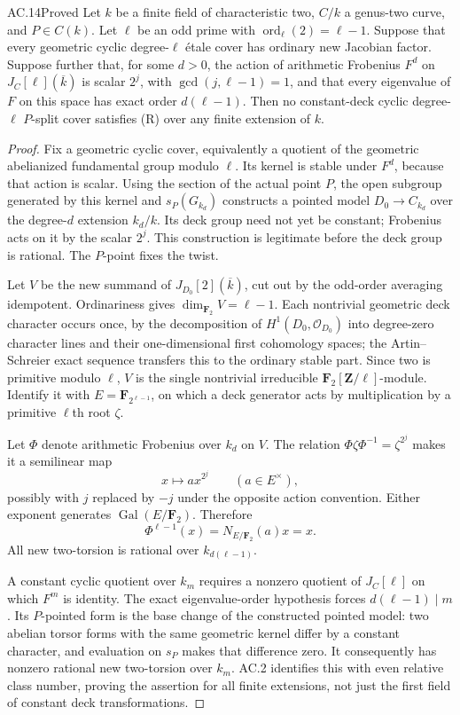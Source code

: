 \begin{claim}{AC.14}{Proved}
Let $k$ be a finite field of characteristic two, $C/k$ a genus-two curve,
and $P\in C(k)$.  Let $\ell$ be an odd prime with
$\operatorname{ord}_{\ell}(2)=\ell-1$.  Suppose that every geometric
cyclic degree-$\ell$ \'etale cover has ordinary new Jacobian factor.
Suppose further that, for some $d>0$, the action of arithmetic Frobenius
$F^d$ on $J_C[\ell](\overline k)$ is scalar $2^j$, with
$\gcd(j,\ell-1)=1$, and that every eigenvalue of $F$ on this space has
exact order $d(\ell-1)$.  Then no constant-deck cyclic degree-$\ell$
$P$-split cover satisfies (R) over any finite extension of $k$.
\end{claim}
\begin{proof}
Fix a geometric cyclic cover, equivalently a quotient of the geometric
abelianized fundamental group modulo $\ell$.  Its kernel is stable under
$F^d$, because that action is scalar.  Using the section of the actual
point $P$, the open subgroup generated by this kernel and $s_P(G_{k_d})$
constructs a pointed model $D_0\to C_{k_d}$ over the degree-$d$ extension
$k_d/k$.  Its deck group need not yet be constant; Frobenius acts on it
by the scalar $2^j$.  This construction is legitimate before the deck
group is rational.  The $P$-point fixes the twist.

Let $V$ be the new summand of $J_{D_0}[2](\overline k)$, cut out by the
odd-order averaging idempotent.  Ordinariness gives
$\dim_{\mathbf F_2}V=\ell-1$.  Each nontrivial geometric deck character
occurs once, by the decomposition of
$H^1(D_0,\mathcal O_{D_0})$ into degree-zero character lines and their
one-dimensional first cohomology spaces; the Artin--Schreier exact
sequence transfers this to the ordinary stable part.  Since two is
primitive modulo $\ell$, $V$ is the single nontrivial irreducible
$\mathbf F_2[\mathbf Z/\ell]$-module.  Identify it with
$E=\mathbf F_{2^{\ell-1}}$, on which a deck generator acts by multiplication
by a primitive $\ell$th root $\zeta$.

Let $\Phi$ denote arithmetic Frobenius over $k_d$ on $V$.  The relation
$\Phi\zeta\Phi^{-1}=\zeta^{2^j}$ makes it a semilinear map
\[
                            x\longmapsto a x^{2^j}
                  \qquad(a\in E^\times),
\]
possibly with $j$ replaced by $-j$ under the opposite action convention.
Either exponent generates $\operatorname{Gal}(E/\mathbf F_2)$.
Therefore
\[
                 \Phi^{\ell-1}(x)
                   =N_{E/\mathbf F_2}(a)x=x.
\]
All new two-torsion is rational over $k_{d(\ell-1)}$.

A constant cyclic quotient over $k_m$ requires a nonzero quotient of
$J_C[\ell]$ on which $F^m$ is identity.  The exact eigenvalue-order
hypothesis forces $d(\ell-1)\mid m$.  Its $P$-pointed form is the base
change of the constructed pointed model: two abelian torsor forms with
the same geometric kernel differ by a constant character, and evaluation
on $s_P$ makes that difference zero.  It consequently has nonzero rational
new two-torsion over $k_m$.  AC.2 identifies this with even relative class
number, proving the assertion for all finite extensions, not just the
first field of constant deck transformations.
\end{proof}

